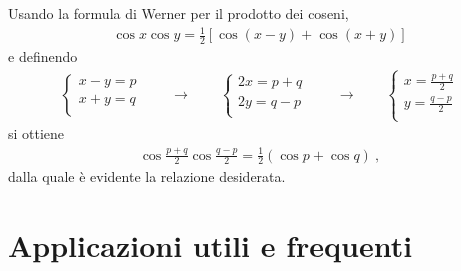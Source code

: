 \documentclass[letterpaper,10pt,italian]{jupyterBook}
\begin{document}
\sphinxAtStartPar
Usando la formula di Werner per il prodotto dei coseni,
\begin{equation*}
\begin{split}\cos x \cos y = \frac{1}{2} \left[ \cos(x-y) + \cos(x+y) \right]\end{split}
\end{equation*}
\sphinxAtStartPar
e definendo
\begin{equation*}
\begin{split}\begin{cases}
  x-y = p \\
  x+y = q \\
\end{cases}
\qquad \rightarrow \qquad
\begin{cases}
  2 x = p + q \\
  2 y = q - p \\
\end{cases}
\qquad \rightarrow \qquad
\begin{cases}
  x = \frac{ p + q }{2} \\
  y = \frac{ q - p }{2} \\
\end{cases}
\end{split}
\end{equation*}
\sphinxAtStartPar
si ottiene
\begin{equation*}
\begin{split}\cos \frac{p+q}{2} \cos\frac{q-p}{2} = \frac{1}{2} \left( \cos p + \cos q \right) \ ,\end{split}
\end{equation*}
\sphinxAtStartPar
dalla quale è evidente la relazione desiderata.


\section{Applicazioni utili e frequenti}
\label{\detokenize{ch/trigonometry:applicazioni-utili-e-frequenti}}
\end{document}
